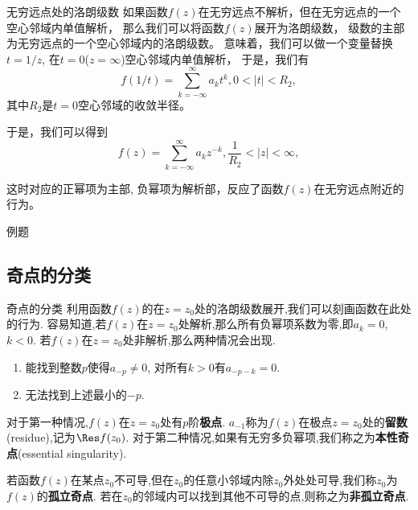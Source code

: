 \documentclass[fontset=windows, chinese, 10pt]{beamer}
\begin{document}
\begin{frame}{无穷远点处的洛朗级数}
如果函数$f(z)$在无穷远点不解析，但在无穷远点的一个空心邻域内单值解析，
那么我们可以将函数$f(z)$展开为洛朗级数，
级数的主部为无穷远点的一个空心邻域内的洛朗级数。
意味着，我们可以做一个变量替换$t = 1/z$, 在$t=0$($z=\infty$)空心邻域内单值解析，
于是，我们有
\[
f(1/t) = \sum_{k=-\infty}^{\infty} a_k t^k, 0 < |t| < R_2, 
\]
其中$R_2$是$t=0$空心邻域的收敛半径。

于是，我们可以得到
\[
f(z) = \sum_{k=-\infty}^{\infty} a_k z^{-k},  \frac{1}{R_2} < |z| < \infty, 
\]

这时对应的正幂项为主部, 负幂项为解析部，反应了函数$f(z)$在无穷远点附近的行为。
\end{frame}



\begin{frame}{例题}
  \small
\end{frame}


\subsection{奇点的分类}
\label{subsec:singular_points}

\begin{frame}{奇点的分类}
  \small
利用函数$f(z)$的在$z=z_0$处的洛朗级数展开,我们可以刻画函数在此处的行为.
容易知道,若$f(z)$在$z=z_0$处解析,那么所有负幂项系数为零,即$a_k = 0$, $k<0$.
若$f(z)$在$z=z_0$处非解析,那么两种情况会出现.
\begin{enumerate}
    \item 能找到整数$p$使得$a_{-p} \neq 0$, 对所有$k>0$有$a_{-p - k}=0$.
    \item 无法找到上述最小的$-p$.
\end{enumerate}
对于第一种情况,$f(z)$在$z=z_0$处有$p$阶\textbf{极点}. $a_{-1}$称为$f(z)$在极点$z=z_0$处的\textbf{留数}(residue),记为$\Res f(z_0)$.
对于第二种情况,如果有无穷多负幂项,我们称之为\textbf{本性奇点}(essential singularity).

若函数$f(z)$在某点$z_0$不可导,但在$z_0$的任意小邻域内除$z_0$外处处可导,我们称$z_0$为$f(z)$的\textbf{孤立奇点}.
若在$z_0$的邻域内可以找到其他不可导的点,则称之为\textbf{非孤立奇点}.

\end{frame}
\end{document}
